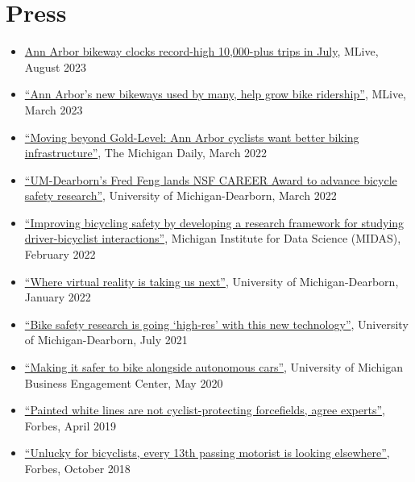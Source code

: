 \documentclass[11pt]{article}
\newenvironment{main}
{\begin{adjustwidth}{3em}{}}
{\end{adjustwidth}}
\begin{document}
\section*{Press}
\begin{main}

\begin{itemize}
    \item \href{https://www.mlive.com/news/ann-arbor/2023/08/ann-arbor-bikeway-clocks-record-high-10000-plus-trips-in-july.html}{Ann Arbor bikeway clocks record-high 10,000-plus trips in July}, MLive, August 2023
    \item \href{https://www.mlive.com/news/ann-arbor/2023/03/ann-arbors-new-bikeways-used-by-many-help-grow-bike-ridership.html}{``Ann Arbor’s new bikeways used by many, help grow bike ridership''}, MLive, March 2023
    \item \href{https://www.michigandaily.com/news/moving-beyond-gold-level-ann-arbor-cyclists-want-better-biking-infrastructure/}{``Moving beyond Gold-Level: Ann Arbor cyclists want better biking infrastructure''}, The Michigan Daily, March 2022
    \item \href{https://umdearborn.edu/news/articles/um-dearborns-fred-feng-lands-nsf-career-award-advance-bicycle-safety-research}{``UM-Dearborn’s Fred Feng lands NSF CAREER Award to advance bicycle safety research''}, University of Michigan-Dearborn, March 2022
    \item \href{https://midas.umich.edu/improving-bicycling-safety/}{``Improving bicycling safety by developing a research framework for studying driver-bicyclist interactions''}, Michigan Institute for Data Science (MIDAS), February 2022
    \item \href{https://umdearborn.edu/news/articles/where-virtual-reality-taking-us-next}{``Where virtual reality is taking us next''}, University of Michigan-Dearborn, January 2022
    \item \href{https://umdearborn.edu/news/articles/bike-safety-research-going-high-res-new-technology}{``Bike safety research is going `high-res' with this new technology''}, University of Michigan-Dearborn, July 2021
    \item \href{http://umich.edu/~fredfeng/files/Making-it-safer-to-bike-alongside-autonomous-cars.pdf}{``Making it safer to bike alongside autonomous cars''}, University of Michigan Business Engagement Center, May 2020
    \item \href{https://www.forbes.com/sites/carltonreid/2019/04/16/painted-white-lines-are-not-cyclist-protecting-forcefields-agree-experts/}{``Painted white lines are not cyclist-protecting forcefields, agree experts''}, Forbes, April 2019
    \item \href{https://www.forbes.com/sites/carltonreid/2018/10/10/unlucky-for-bicyclists-every-13th-passing-motorist-is-looking-elsewhere/}{``Unlucky for bicyclists, every 13th passing motorist is looking elsewhere''}, Forbes, October 2018
\end{itemize}


\end{main}
\end{document}

